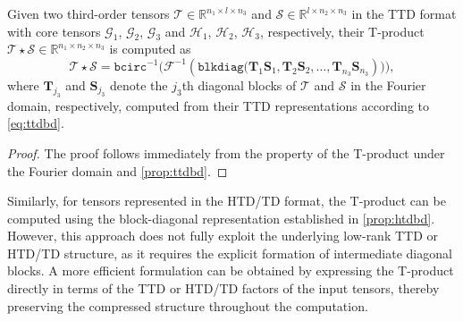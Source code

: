 \documentclass[onefignum,onetabnum]{siamart250211}
\begin{document}
\begin{corollary}\label{coro:ttdtproduct}
    Given two third-order tensors 
$\mathscr{T}\in\mathbb{R}^{n_1\times l\times n_3}$ and
$\mathscr{S}\in\mathbb{R}^{l\times n_2\times n_3}$ in the TTD format with core tensors $\mathscr{G}_1$, $\mathscr{G}_2$, $\mathscr{G}_3$ and $\mathscr{H}_1$, 
$\mathscr{H}_2$,
$\mathscr{H}_3$, respectively, their T-product $\mathscr{T}\star\mathscr{S}\in\mathbb{R}^{n_1\times n_2\times n_3}$ is computed as
\begin{equation*}
   \mathscr{T}\star\mathscr{S} = \texttt{bcirc}^{-1}\Big(\mathcal{F}^{-1}(\texttt{blkdiag}\big(\textbf{T}_1\textbf{S}_1,\textbf{T}_2\textbf{S}_2,\dots,\textbf{T}_{n_3}\textbf{S}_{n_3})\big)\Big),
\end{equation*}
where $\textbf{T}_{j_3}$ and $\textbf{S}_{j_3}$ denote the 
$j_3$th diagonal blocks  of $\mathscr{T}$ and $\mathscr{S}$ in the Fourier domain, respectively, computed from their TTD representations according to \eqref{eq:ttdbd}.
\end{corollary}
\begin{proof}
    The proof follows immediately from the property of the T-product under the Fourier domain and \cref{prop:ttdbd}.
\end{proof}

Similarly, for tensors represented in the HTD/TD format, the T-product can be computed using the block-diagonal representation established in \cref{prop:htdbd}.  However, this approach does not fully exploit the underlying low-rank TTD or HTD/TD structure, as it requires the explicit formation of intermediate diagonal blocks. A more efficient formulation can be obtained by expressing the T-product directly in terms of the TTD or HTD/TD factors of the input tensors, thereby preserving the compressed structure throughout the computation.
\end{document}
